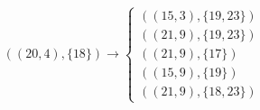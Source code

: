 \begin{minipage}{5.0cm}
\vspace{-1cm}


%
\fontsize{8}{10}\selectfont \[((20,4),\{18\}) \rightarrow \begin{cases}
((15,3),\{19,23\}) \\
((21,9),\{19,23\}) \\
((21,9),\{17\})\\
((15,9),\{19\}) \\
((21,9),\{18,23\}) 
\end{cases}\]
%
\end{minipage}
